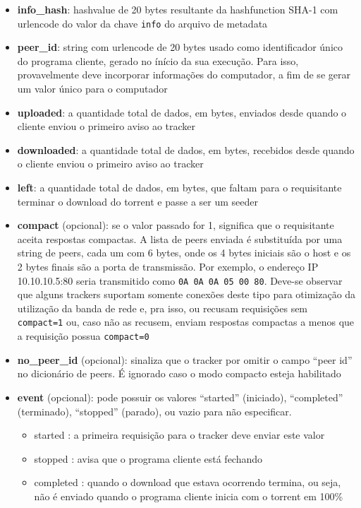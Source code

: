 \begin{itemize}
    \item \textbf{info\_hash}: \gls*{hashvalue} de 20 bytes resultante da
    \gls*{hashfunction} SHA-1 com \gls*{urlencode} do valor da chave \verb|info| do
    arquivo de \gls*{metadata}

    \item \textbf{peer\_id}: \gls*{string} com \gls*{urlencode} de 20 bytes usado como
    identificador único do programa cliente, gerado no ínício da sua execução. Para
    isso, provavelmente deve incorporar informações do computador, a fim de se gerar um
    valor único para o computador

    \item \textbf{uploaded}: a quantidade total de dados, em bytes, enviados desde
    quando o cliente enviou o primeiro aviso ao \gls*{tracker}

    \item \textbf{downloaded}: a quantidade total de dados, em bytes, recebidos desde
    quando o cliente enviou o primeiro aviso ao \gls*{tracker}

    \item \textbf{left}: a quantidade total de dados, em bytes, que faltam para o
    requisitante terminar o download do \gls*{torrent} e passe a ser um \gls*{seeder}

    \item \textbf{compact} (opcional): se o valor passado for 1, significa que o
    requisitante aceita respostas compactas. A lista de \glspl*{peer} enviada é
    substituída por uma \gls*{string} de peers, cada um com 6 bytes, onde os 4 bytes
    iniciais são o host e os 2 bytes finais são a porta de transmissão. Por exemplo, o
    endereço IP 10.10.10.5:80 seria transmitido como \verb|0A 0A 0A 05 00 80|. Deve-se
    observar que alguns \glspl*{tracker} suportam somente conexões deste tipo para
    otimização da utilização da banda de rede e, pra isso, ou recusam requisições sem
    \verb|compact=1| ou, caso não as recusem, enviam respostas compactas a menos que a
    requisição possua \verb|compact=0|

    \item \textbf{no\_peer\_id} (opcional): sinaliza que o \gls*{tracker} por omitir o
    campo ``\gls*{peer} id'' no dicionário de \glspl*{peer}. É ignorado caso o modo
    compacto esteja habilitado

    \item \textbf{event} (opcional): pode possuir os valores ``started'' (iniciado),
    ``completed'' (terminado), ``stopped'' (parado), ou vazio para não especificar.
    \begin{itemize}
        \item started : a primeira requisição para o \gls*{tracker} deve enviar este
        valor
        \item stopped : avisa que o programa cliente está fechando
        \item completed : quando o download que estava ocorrendo termina, ou seja, não
        é enviado quando o programa cliente inicia com o \gls*{torrent} em 100\%
    \end{itemize}


\end{itemize}
